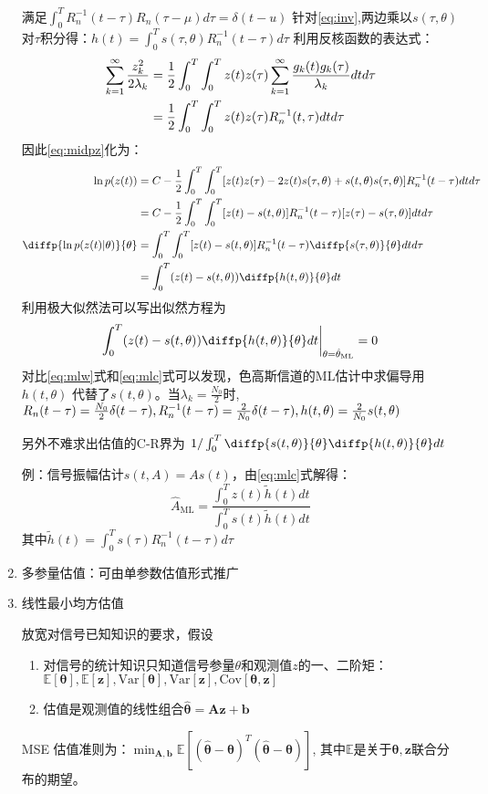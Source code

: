 \documentclass{article}
\def\E{\mathbb{E}}
\def\Var{\textrm{Var}}
\def\Cov{\textrm{Cov}}
\begin{document}
\begin{enumerate}
满足$\int_0^T R_n^{-1}(t-\tau)R_n(\tau-\mu)d\tau = \delta(t-u)$
针对\eqref{eq:inv},两边乘以$s(\tau,\theta)$对$\tau$积分得：$h(t)=\int_0^T s(\tau,\theta)R_n^{-1}(t-\tau)d\tau$
利用反核函数的表达式：
\begin{align*}
\sum_{k=1}^{\infty} \frac{z_k^2}{2\lambda_k} & = {1\over 2} \int_0^T\int_0^T z(t)z(\tau)\sum_{k=1}^{\infty} \frac{g_k(t)g_k(\tau)}{\lambda_k} dt d\tau \\
& = {1\over 2} \int_0^T\int_0^T z(t)z(\tau)R_n^{-1}(t,\tau)dtd\tau
\end{align*}
因此\eqref{eq:midpz}化为：
\begin{align*}
\ln p(z(t)) & = C-{1\over 2}\int_0^T\int_0^T [z(t)z(\tau)-2z(t)s(\tau,\theta)+s(t,\theta)s(\tau,\theta)]R_n^{-1}(t-\tau)dtd\tau \\
            & = C-{1 \over 2}\int_0^T \int_0^T [z(t)-s(t,\theta)]R_n^{-1}(t-\tau)[z(\tau)-s(\tau,\theta)]dtd\tau  \\
\diffp{\ln p(z(t)|\theta)}{\theta} & = \int_0^T\int_0^T [z(t)-s(t,\theta)]R_n^{-1}(t-\tau)\diffp{s(\tau,\theta)}{\theta}dtd\tau \\
    & = \int_0^T (z(t)-s(t,\theta))\diffp{h(t,\theta)}{\theta}dt
\end{align*}
利用极大似然法可以写出似然方程为
\begin{equation}\label{eq:mlc}
\int_0^T (z(t)-s(t,\theta))\diffp{h(t,\theta)}{\theta}dt{\bigg\rvert}_{\theta=\hat{\theta}_{\mathrm{ML}}}=0
\end{equation}
对比\eqref{eq:mlw}式和\eqref{eq:mlc}式可以发现，色高斯信道的ML估计中求偏导用$h(t,\theta)$ 代替了$s(t,\theta)$。当$\lambda_k=\frac{N_0}{2}$时,
$R_n(t-\tau)={N_0 \over 2}\delta(t-\tau),R_n^{-1}(t-\tau)={2 \over N_0}\delta(t-\tau),h(t,\theta) = {2 \over N_0}s(t,\theta)$

另外不难求出估值的C-R界为 $1/\int_0^T \diffp{s(t,\theta)}{\theta}\diffp{h(t,\theta)}{\theta}dt$

例：信号振幅估计$s(t,A)=As(t)$，由\eqref{eq:mlc}式解得：
$$
\hat{A}_{\mathrm{ML}} = \frac{\int_0^T z(t)\tilde{h}(t)dt}{\int_0^T s(t)\tilde{h}(t)dt}
$$
其中$\tilde{h}(t) = \int_0^T s(\tau)R_n^{-1}(t-\tau)d\tau$
\item 多参量估值：可由单参数估值形式推广
\item 线性最小均方估值

放宽对信号已知知识的要求，假设
\begin{enumerate}[label=(\alph*)]
\item 对信号的统计知识只知道信号参量$\theta$和观测值$z$的一、二阶矩：$\E[\bm{\theta}],\E[\bm{z}],\Var[\bm{\theta}],\Var[\bm{z}],\Cov[\bm{\theta},\bm{z}]$
\item 估值是观测值的线性组合$\hat{\bm{\theta}} = \bm{A} \bm{z}+\bm{b}$
\end{enumerate}
MSE 估值准则为：$\min_{\bm{A},\bm{b}}\E[(\hat{\bm{\theta}}-\bm{\theta})^T(\hat{\bm{\theta}}-\bm{\theta})]$,
其中$\E$是关于$\bm{\theta},\bm{z}$联合分布的期望。


\end{enumerate}
\end{document}
